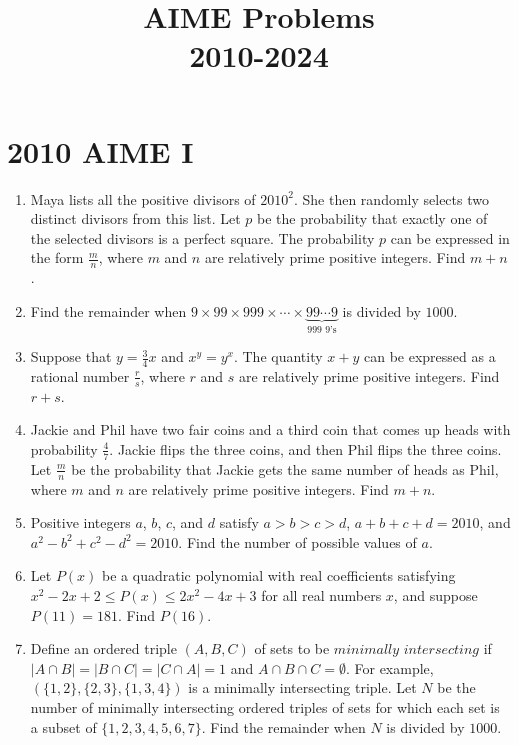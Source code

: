 \documentclass{article}
\title{AIME Problems \\ 2010-2024}
\date{}
\begin{document}
\maketitle\thispagestyle{fancy}\tableofcontents\newpage\section*{2010 AIME I}\begin{enumerate}[label=\arabic*., itemsep=0.5em]\item Maya lists all the positive divisors of $2010^2$. She then randomly selects two distinct divisors from this list. Let $p$ be the probability that exactly one of the selected divisors is a perfect square. The probability $p$ can be expressed in the form $\frac {m}{n}$, where $m$ and $n$ are relatively prime positive integers. Find $m + n$.\par \vspace{0.5em}\item Find the remainder when $9 \times 99 \times 999 \times \cdots \times \underbrace{99\cdots9}_{\text{999 9's}}$ is divided by $1000$.\par \vspace{0.5em}\item Suppose that $y = \frac34x$ and $x^y = y^x$. The quantity $x + y$ can be expressed as a rational number $\frac {r}{s}$, where $r$ and $s$ are relatively prime positive integers. Find $r + s$.\par \vspace{0.5em}\item Jackie and Phil have two fair coins and a third coin that comes up heads with probability $\frac47$. Jackie flips the three coins, and then Phil flips the three coins. Let $\frac {m}{n}$ be the probability that Jackie gets the same number of heads as Phil, where $m$ and $n$ are relatively prime positive integers. Find $m + n$.\par \vspace{0.5em}\item Positive integers $a$, $b$, $c$, and $d$ satisfy $a > b > c > d$, $a + b + c + d = 2010$, and $a^2 - b^2 + c^2 - d^2 = 2010$. Find the number of possible values of $a$.\par \vspace{0.5em}\item Let $P(x)$ be a quadratic polynomial with real coefficients satisfying $x^2 - 2x + 2 \le P(x) \le 2x^2 - 4x + 3$ for all real  numbers $x$, and suppose $P(11) = 181$. Find $P(16)$.\par \vspace{0.5em}\item Define an ordered triple $(A, B, C)$ of sets to be $\textit{minimally intersecting}$ if $|A \cap B| = |B \cap C| = |C \cap A| = 1$ and $A \cap B \cap C = \emptyset$. For example, $(\{1,2\},\{2,3\},\{1,3,4\})$ is a minimally intersecting triple. Let $N$ be the number of minimally intersecting ordered triples of sets for which each set is a subset of $\{1,2,3,4,5,6,7\}$. Find the remainder when $N$ is divided by $1000$.


\end{enumerate}
\end{document}
